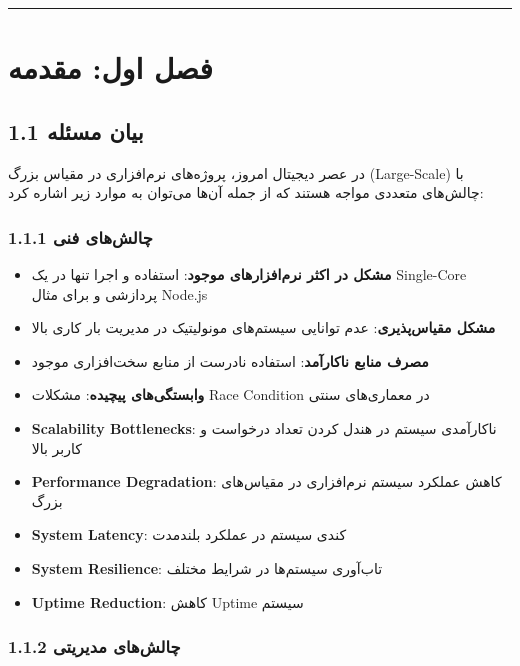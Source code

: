 \documentclass[
]{article}
\providecommand{\tightlist}{%
  \setlength{\itemsep}{0pt}\setlength{\parskip}{0pt}}
\begin{document}
\begin{center}\rule{0.5\linewidth}{0.5pt}\end{center}

\section{فصل اول:
مقدمه}\label{ux641ux635ux644-ux627ux648ux644-ux645ux642ux62fux645ux647}

\subsection{1.1 بیان
مسئله}\label{ux628ux6ccux627ux646-ux645ux633ux626ux644ux647}

در عصر دیجیتال امروز، پروژه‌های نرم‌افزاری در مقیاس بزرگ (Large-Scale) با
چالش‌های متعددی مواجه هستند که از جمله آن‌ها می‌توان به موارد زیر اشاره
کرد:

\subsubsection{1.1.1 چالش‌های
فنی}\label{ux686ux627ux644ux634ux647ux627ux6cc-ux641ux646ux6cc}

\begin{itemize}
\tightlist
\item
  \textbf{مشکل در اکثر نرم‌افزارهای موجود}: استفاده و اجرا تنها در یک
  Single-Core پردازشی و برای مثال Node.js
\item
  \textbf{مشکل مقیاس‌پذیری}: عدم توانایی سیستم‌های مونولیتیک در مدیریت بار
  کاری بالا
\item
  \textbf{مصرف منابع ناکارآمد}: استفاده نادرست از منابع سخت‌افزاری موجود
\item
  \textbf{وابستگی‌های پیچیده}: مشکلات Race Condition در معماری‌های سنتی
\item
  \textbf{Scalability Bottlenecks}: ناکارآمدی سیستم در هندل کردن تعداد
  درخواست و کاربر بالا
\item
  \textbf{Performance Degradation}: کاهش عملکرد سیستم نرم‌افزاری در
  مقیاس‌های بزرگ
\item
  \textbf{System Latency}: کندی سیستم در عملکرد بلندمدت
\item
  \textbf{System Resilience}: تاب‌آوری سیستم‌ها در شرایط مختلف
\item
  \textbf{Uptime Reduction}: کاهش Uptime سیستم
\end{itemize}

\subsubsection{1.1.2 چالش‌های
مدیریتی}\label{ux686ux627ux644ux634ux647ux627ux6cc-ux645ux62fux6ccux631ux6ccux62aux6cc}
\end{document}
